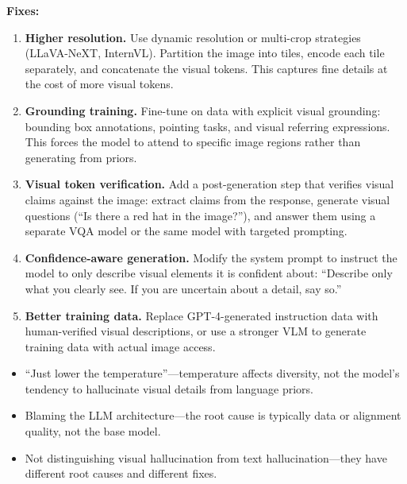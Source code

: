 \begin{interviewq}
\textbf{Fixes:}
\begin{enumerate}
    \item \textbf{Higher resolution.} Use dynamic resolution or multi-crop strategies (LLaVA-NeXT, InternVL). Partition the image into tiles, encode each tile separately, and concatenate the visual tokens. This captures fine details at the cost of more visual tokens.
    \item \textbf{Grounding training.} Fine-tune on data with explicit visual grounding: bounding box annotations, pointing tasks, and visual referring expressions. This forces the model to attend to specific image regions rather than generating from priors.
    \item \textbf{Visual token verification.} Add a post-generation step that verifies visual claims against the image: extract claims from the response, generate visual questions (``Is there a red hat in the image?''), and answer them using a separate VQA model or the same model with targeted prompting.
    \item \textbf{Confidence-aware generation.} Modify the system prompt to instruct the model to only describe visual elements it is confident about: ``Describe only what you clearly see. If you are uncertain about a detail, say so.''
    \item \textbf{Better training data.} Replace GPT-4-generated instruction data with human-verified visual descriptions, or use a stronger VLM to generate training data with actual image access.
\end{enumerate}

\redflags
\begin{itemize}
    \item ``Just lower the temperature''---temperature affects diversity, not the model's tendency to hallucinate visual details from language priors.
    \item Blaming the LLM architecture---the root cause is typically data or alignment quality, not the base model.
    \item Not distinguishing visual hallucination from text hallucination---they have different root causes and different fixes.
\end{itemize}



\end{interviewq}
